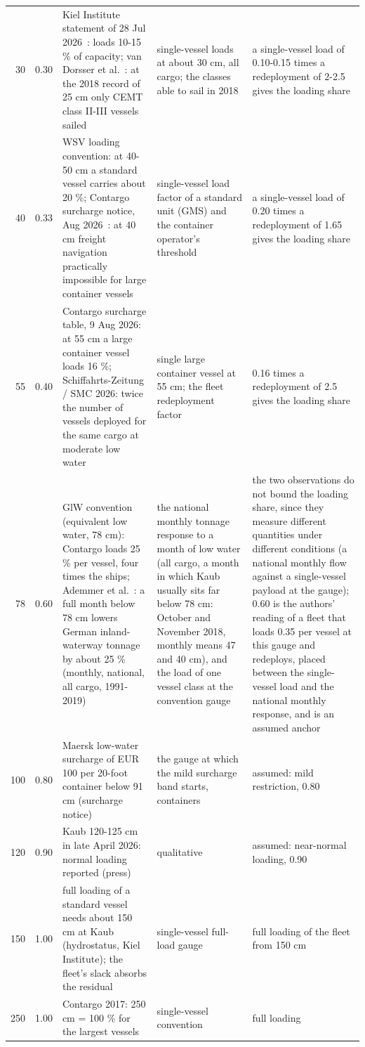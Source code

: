 \begin{longtable}{rL{11mm}L{45mm}L{40mm}L{42mm}}
30 & 0.30 & Kiel Institute statement of 28 Jul 2026~\citep{ifw2026}: loads 10-15 \% of capacity; van Dorsser et al.~\citep{vandorsser2020}: at the 2018 record of 25 cm only CEMT class II-III vessels sailed & single-vessel loads at about 30 cm, all cargo; the classes able to sail in 2018 & a single-vessel load of 0.10-0.15 times a redeployment of 2-2.5 gives the loading share \\
40 & 0.33 & WSV loading convention: at 40-50 cm a standard vessel carries about 20 \%; Contargo surcharge notice, Aug 2026~\citep{contargo2026}: at 40 cm freight navigation practically impossible for large container vessels & single-vessel load factor of a standard unit (GMS) and the container operator's threshold & a single-vessel load of 0.20 times a redeployment of 1.65 gives the loading share \\
55 & 0.40 & Contargo surcharge table, 9 Aug 2026: at 55 cm a large container vessel loads 16 \%; Schiffahrts-Zeitung / SMC 2026: twice the number of vessels deployed for the same cargo at moderate low water & single large container vessel at 55 cm; the fleet redeployment factor & 0.16 times a redeployment of 2.5 gives the loading share \\
78 & 0.60 & GlW convention (equivalent low water, 78 cm): Contargo loads 25 \% per vessel, four times the ships; Ademmer et al.~\citep{ademmer2023}: a full month below 78 cm lowers German inland-waterway tonnage by about 25 \% (monthly, national, all cargo, 1991-2019) & the national monthly tonnage response to a month of low water (all cargo, a month in which Kaub usually sits far below 78 cm: October and November 2018, monthly means 47 and 40 cm), and the load of one vessel class at the convention gauge & the two observations do not bound the loading share, since they measure different quantities under different conditions (a national monthly flow against a single-vessel payload at the gauge); 0.60 is the authors' reading of a fleet that loads 0.35 per vessel at this gauge and redeploys, placed between the single-vessel load and the national monthly response, and is an assumed anchor \\
100 & 0.80 & Maersk low-water surcharge of EUR 100 per 20-foot container below 91 cm (surcharge notice) & the gauge at which the mild surcharge band starts, containers & assumed: mild restriction, 0.80 \\
120 & 0.90 & Kaub 120-125 cm in late April 2026: normal loading reported (press) & qualitative & assumed: near-normal loading, 0.90 \\
150 & 1.00 & full loading of a standard vessel needs about 150 cm at Kaub (hydrostatus, Kiel Institute); the fleet's slack absorbs the residual & single-vessel full-load gauge & full loading of the fleet from 150 cm \\
250 & 1.00 & Contargo 2017: 250 cm = 100 \% for the largest vessels & single-vessel convention & full loading \\
\bottomrule
\end{longtable}
\endgroup
